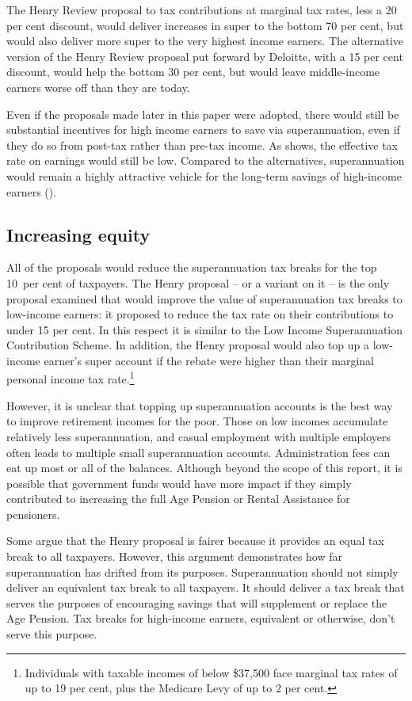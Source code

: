 \documentclass{grattanAlpha}
\begin{document}
The Henry Review proposal to tax contributions at marginal tax rates, less a 20 per cent discount, would deliver increases in super to the bottom 70 per cent, but would also deliver more super to the very highest income earners. The alternative version of the Henry Review proposal put forward by Deloitte, with a 15 per cent discount, would help the bottom 30 per cent, but would leave middle-income earners worse off than they are today. 

Even if the proposals made later in this paper were adopted, there would still be substantial incentives for high income earners to save via superannuation, even if they do so from post-tax rather than pre-tax income. As  shows, the effective tax rate on earnings would still be low. Compared to the alternatives, superannuation would remain a highly attractive vehicle for the long-term savings of high-income earners ().

\subsection{Increasing equity}
All of the proposals would reduce the superannuation tax breaks for the top 10~per cent of taxpayers. The Henry proposal – or a variant on it – is the only proposal examined that would improve the value of superannuation tax breaks to low-income earners: it proposed to reduce the tax rate on their contributions to under 15 per cent. In this respect it is similar to the Low Income Superannuation Contribution Scheme. In addition, the Henry proposal would also top up a low-income earner’s super account if the rebate were higher than their marginal personal income tax rate.\footnote{Individuals with taxable incomes of below \$37,500 face marginal tax rates of up to 19 per cent, plus the Medicare Levy of up to 2 per cent.} 

However, it is unclear that topping up superannuation accounts is the best way to improve retirement incomes for the poor. Those on low incomes accumulate relatively less superannuation, and casual employment with multiple employers often leads to multiple small superannuation accounts. Administration fees can eat up most or all of the balances. Although beyond the scope of this report, it is possible that government funds would have more impact if they simply contributed to increasing the full Age Pension or Rental Assistance for pensioners.

Some argue that the Henry proposal is fairer because it provides an equal tax break to all taxpayers. However, this argument demonstrates how far superannuation has drifted from its purposes. Superannuation should not simply deliver an equivalent tax break to all taxpayers. It should deliver a tax break that serves the purposes of encouraging savings that will supplement or replace the Age Pension. Tax breaks for high-income earners, equivalent or otherwise, don’t serve this purpose.
\end{document}
